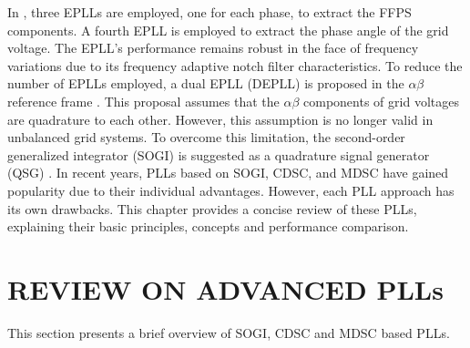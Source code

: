 In \cite{1318659}, three EPLLs are employed, one for each phase, to extract the FFPS components. A fourth EPLL is employed to extract the phase angle of the grid voltage. The EPLL's performance remains robust in the face of frequency variations due to its frequency adaptive notch filter characteristics. To reduce the number of EPLLs employed, a dual EPLL (DEPLL) is proposed in the $\alpha \beta$  reference frame \cite{4153695}. This proposal assumes that the $\alpha \beta$  components of grid voltages are quadrature to each other. However, this assumption is no longer valid in unbalanced grid systems. To overcome this limitation, the second-order generalized integrator (SOGI) is suggested as a quadrature signal generator (QSG) \cite{1711988}. In recent years, PLLs based on SOGI, CDSC, and MDSC have gained popularity due to their individual advantages. However, each PLL approach has its own drawbacks. This chapter provides a concise review of these PLLs, explaining their basic principles, concepts and performance comparison. 
\vspace*{-.5cm}
\section{REVIEW ON ADVANCED PLLs}
This section presents a brief overview of SOGI, CDSC and MDSC based PLLs.
\vspace*{-1.5cm}
